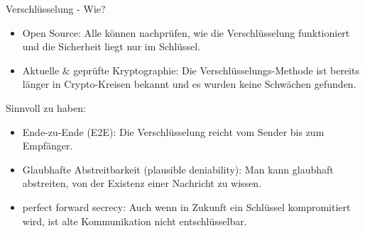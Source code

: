 \documentclass{beamer}
\begin{document}
\begin{frame} {Verschlüsselung - Wie?}
	\begin{itemize}
		\item Open Source: Alle können nachprüfen, wie die Verschlüsselung funktioniert und die Sicherheit liegt nur im Schlüssel.
                \item Aktuelle \& geprüfte Kryptographie: Die Verschlüsselungs-Methode ist bereits länger in Crypto-Kreisen bekannt und es wurden keine Schwächen gefunden.
	\end{itemize}
	
        \pause
	Sinnvoll zu haben:
	\begin{itemize}
            \item Ende-zu-Ende (E2E): Die Verschlüsselung reicht vom Sender bis zum Empfänger.
            \item Glaubhafte Abstreitbarkeit (plausible deniability): Man kann glaubhaft abstreiten, von der Existenz einer Nachricht zu wissen.
	    \item perfect forward secrecy: Auch wenn in Zukunft ein Schlüssel kompromitiert wird, ist alte Kommunikation nicht entschlüsselbar.
	\end{itemize}
\end{frame}
\end{document}
